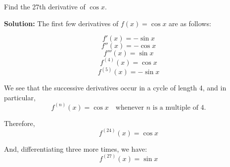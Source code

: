 \documentclass[12pt]{article}
\theoremstyle{beautifulthm}
\begin{document}
\begin{tcolorbox}[colback=examplebg, colframe=red!75!black, title=\textbf{EXAMPLE 2: Derivatives of Trigonometric Functions}, fonttitle=\bfseries, sharp corners]

Find the 27th derivative of \(\cos x\).

\tcblower
\textbf{Solution:}
The first few derivatives of \(f(x) = \cos x\) are as follows:

\[
f'(x) = -\sin x
\]
\[
f''(x) = -\cos x
\]
\[
f'''(x) = \sin x
\]
\[
f^{(4)}(x) = \cos x
\]
\[
f^{(5)}(x) = -\sin x
\]

We see that the successive derivatives occur in a cycle of length 4, and in particular,
\[
f^{(n)}(x) = \cos x \quad \text{whenever } n \text{ is a multiple of 4.}
\]

Therefore,
\[
f^{(24)}(x) = \cos x
\]

And, differentiating three more times, we have:
\[
f^{(27)}(x) = \sin x
\]

\end{tcolorbox}
\end{document}
